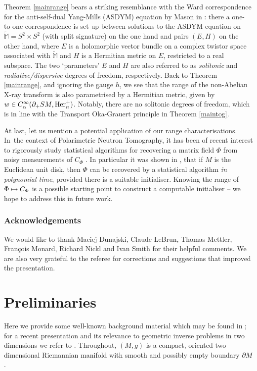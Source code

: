 \documentclass[JEP,XML,SOM,Unicode,published]{cedram}
\newcommand\mto{\mathchoice{\longmapsto}{\mapsto}{\mapsto}{\mapsto}}
\theoremstyle{plain}
\theoremstyle{definition}
\newcommand{\he}{\textup{Her}}
\newcommand{\1}{{\bf 1}}
\begin{document}
Theorem \ref{mainrange} bears a striking resemblance with the Ward correspondence for the anti-self-dual Yang-Mills (ASDYM) equation by Mason in \cite{Mas06}: there a one-to-one correspondence is set up between solutions to the ASDYM equation on $\tilde{\mathbb{M}} = S^2\times S^2$ (with split signature) on the one hand and pairs $(E,H)$ on the other hand, where $E$ is a holomorphic vector bundle on a complex twistor space associated with $\tilde{\mathbb{M}}$ and $H$ is a Hermitian metric on $E$, restricted to a real subspace. The two `parameters' $E$ and $H$ are also referred to as \emph{solitonic} and \emph{radiative/dispersive} degrees of freedom, respectively. Back to Theorem \ref{mainrange}, and ignoring the gauge $h$, we see that the range of the non-Abelian X-ray transform is also parametrised by a Hermitian metric, given by $w\in C^{\infty}_{\alpha}(\partial_+SM, \he^+_n)$. Notably, there are no solitonic degrees of freedom, which is in line with the Transport Oka-Grauert principle in Theorem \ref{maintog}.

At last, let us mention a potential application of our range characterisations. In~the context of Polarimetric Neutron Tomography, it has been of recent interest to rigorously study statistical algorithms for recovering a matrix field $\Phi$ from noisy measurements of $C_\Phi$ \cite{MNP19,MNP20}. In particular it was shown in \cite{BoNi21}, that if $M$ is the Euclidean unit disk, then $\Phi$ can be recovered by a statistical algorithm \emph{in polynomial time}, provided there is a suitable initialiser. Knowing the range of $\Phi\mto C_\Phi$ is a possible starting point to construct a computable initialiser -- we hope to address this in future work.

\subsubsection*{Acknowledgements} We would like to thank
Maciej Dunajski, Claude LeBrun, Thomas Mettler, François Monard, Richard Nickl and Ivan Smith for their helpful comments. We are also very grateful to the referee for corrections and suggestions that improved the presentation.

\section{Preliminaries}\label{prelim}
Here we provide some well-known background material which may be found in \cite{GK,SiTh76}; for a recent presentation and its relevance to geometric inverse problems in two dimensions we refer to \cite{PSU20}.
Throughout, $(M,g)$ is a compact, oriented two dimensional Riemannian manifold with smooth and possibly empty boundary
$\partial M$.
\end{document}
